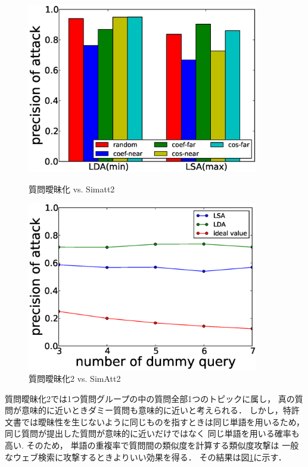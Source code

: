 \documentclass[master]{suribt}
\theoremstyle{definition}
\begin{document}
 \begin{figure}
 \begin{minipage}[t]{0.5\linewidth}
 \centering
 \includegraphics[width=0.9\textwidth]{AAAA2.eps}
 \vspace{5em}
 \caption{質問曖昧化 vs. Simatt2}
 \label{fig:s2:AAAA}
 \end{minipage}%
 \begin{minipage}[t]{0.5\linewidth}
 \centering
 \includegraphics[width=0.9\textwidth]{BBBB2.eps}
 \vspace{5em}
 \caption{質問曖昧化2 vs. SimAtt2}
 \label{fig:s2:BBBB}
 \end{minipage}
 \end{figure}

 質問曖昧化2では1つ質問グループの中の質問全部1つのトピックに属し，
 真の質問が意味的に近いときダミー質問も意味的に近いと考えられる．
 しかし，特許文書では曖昧性を生じないように同じものを指すときは同じ単語を用いるため，
 同じ質問が提出した質問が意味的に近いだけではなく
 同じ単語を用いる確率も高い.
 そのため，
 単語の重複率で質問間の類似度を計算する類似度攻撃は
 一般なウェブ検索に攻撃するときよりいい効果を得る．
 その結果は図\ref{fig:s2:BBBB}に示す．
 
\end{document}
